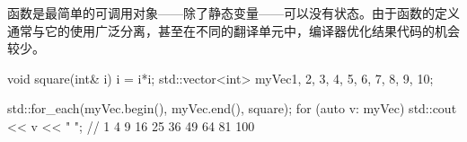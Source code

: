 函数是最简单的可调用对象——除了静态变量——可以没有状态。由于函数的定义通常与它的使用广泛分离，甚至在不同的翻译单元中，编译器优化结果代码的机会较少。

\begin{cpp}
void square(int& i){ i = i*i; }
std::vector<int> myVec{1, 2, 3, 4, 5, 6, 7, 8, 9, 10};

std::for_each(myVec.begin(), myVec.end(), square);
for (auto v: myVec) std::cout << v << " "; // 1 4 9 16 25 36 49 64 81 100
\end{cpp}






